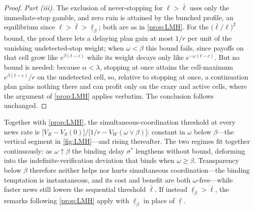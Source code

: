 \documentclass[12pt,reqno]{article}
\theoremstyle{definition} \newtheorem{example}{Example}
\theoremstyle{definition} \newtheorem{condition}{Condition}
\theoremstyle{definition} \newtheorem{corollary}{Corollary}
\theoremstyle{definition} \newtheorem{claim}{Claim}
\theoremstyle{definition} \newtheorem{definition}{Definition}
\theoremstyle{definition} \newtheorem{conjecture}{Conjecture}
\theoremstyle{definition} \newtheorem{Lemma}{Lemma}
\theoremstyle{definition} \newtheorem{lemma}{Lemma}
\theoremstyle{plain} \newtheorem{theorem}{Theorem}
\theoremstyle{definition} \newtheorem{assumption}{Assumption}
\theoremstyle{definition} \newtheorem*{assumptionnonumber}{Assumption}
\theoremstyle{definition} \newtheorem*{theoremNoNumber}{Proposition}
\theoremstyle{definition}
\theoremstyle{definition}\newtheorem{proposition}{Proposition}
\theoremstyle{definition} \newtheorem{result}{Result}
\theoremstyle{definition} \newtheorem*{definitionNoNumber}{Definition}
\theoremstyle{definition} \newtheorem{Definition}{Definition}
\theoremstyle{definition} \newtheorem*{DefinitionNoNumber}{Definition}
\theoremstyle{definition} \newtheorem*{fact}{Fact}
\theoremstyle{definition} \newtheorem*{property}{Property}
\theoremstyle{definition} \newtheorem{remark}{Remark}
\begin{document}
\begin{proof}
\noindent  \emph{Part (iii).} The exclusion of never-stopping for $\ell>\bar\ell$ uses only the immediate-stop gamble, and zero ruin is attained by the bunched profile, an equilibrium since $\ell>\bar\ell>\underline\ell_\beta$; both are as in \cref{prop:LMH}. For the $\big(\bar\ell/\ell\big)^2$ bound, the proof there lets a delaying plan gain at most $1/r$ per unit of the vanishing undetected-stop weight; when $\omega<\beta$ this bound fails, since payoffs on that cell grow like $e^{\beta(t-c)}$ while its weight decays only like $e^{-\omega(t-c)}$. But no bound is needed: because $\alpha<\lambda$, stopping at once attains the cell-maximum $e^{\beta(t-c)}/r$ on the undetected cell, so, relative to stopping at once, a continuation plan gains nothing there and can profit only on the crazy and active cells, where the argument of \cref{prop:LMH} applies verbatim. The conclusion follows unchanged.
\end{proof}

Together with \cref{prop:LMH}, the simultaneous-coordination threshold at every news rate is $\big[V_R-V_S(0)\big]/\big[1/r-V_W(\omega\vee\beta)\big]$: constant in $\omega$ below $\beta$---the vertical segment in \cref{fig:LMH}---and rising thereafter. The two regimes fit together continuously: as $\omega\uparrow\beta$ the binding delay $\sigma^\ast$ lengthens without bound, deforming into the indefinite-verification deviation that binds when $\omega\ge\beta$. Transparency below $\beta$ therefore neither helps nor hurts simultaneous coordination---the binding temptation is instantaneous, and its cost and benefit are both $\omega$-free---while faster news still lowers the sequential threshold $\bar\ell$. If instead $\underline\ell_\beta>\bar\ell$, the remarks following \cref{prop:LMH} apply with $\underline\ell_\beta$ in place of $\underline\ell$.
\end{document}
